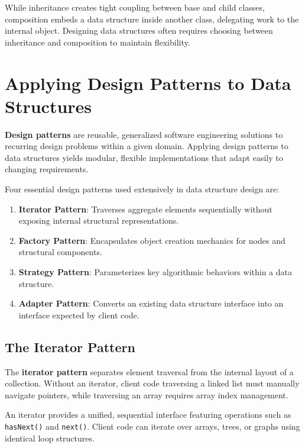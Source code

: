\documentclass[12pt]{report}
\begin{document}
While inheritance creates tight coupling between base and child classes, composition embeds a data structure inside another class, delegating work to the internal object. Designing data structures often requires choosing between inheritance and composition to maintain flexibility.

\section{Applying Design Patterns to Data Structures}

\textbf{Design patterns} are reusable, generalized software engineering solutions to recurring design problems within a given domain. Applying design patterns to data structures yields modular, flexible implementations that adapt easily to changing requirements.

Four essential design patterns used extensively in data structure design are:

\begin{enumerate}
    \item \textbf{Iterator Pattern}: Traverses aggregate elements sequentially without exposing internal structural representations.
    \item \textbf{Factory Pattern}: Encapsulates object creation mechanics for nodes and structural components.
    \item \textbf{Strategy Pattern}: Parameterizes key algorithmic behaviors within a data structure.
    \item \textbf{Adapter Pattern}: Converts an existing data structure interface into an interface expected by client code.
\end{enumerate}

\subsection{The Iterator Pattern}

The \textbf{iterator pattern} separates element traversal from the internal layout of a collection. Without an iterator, client code traversing a linked list must manually navigate pointers, while traversing an array requires array index management.

An iterator provides a unified, sequential interface featuring operations such as \texttt{hasNext()} and \texttt{next()}. Client code can iterate over arrays, trees, or graphs using identical loop structures.
\end{document}
